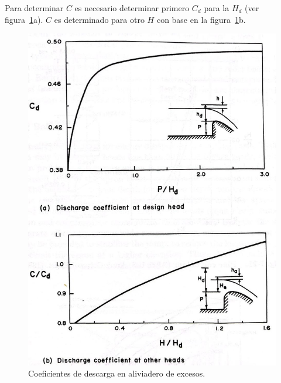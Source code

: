 \documentclass[11pt, oneside]{article}
\begin{document}
Para determinar $C$ es necesario determinar primero $C_d$ para la $H_d$ (ver figura~\ref{fig720}a). $C$ es determinado para otro $H$ con base en la figura~\ref{fig720}b. 
\begin{figure}[h]
    \centering
    \includegraphics[width=0.8\linewidth]{fig720.jpeg}
    \caption{Coeficientes de descarga en aliviadero de excesos.}
    \label{fig720}
\end{figure}
\end{document}
